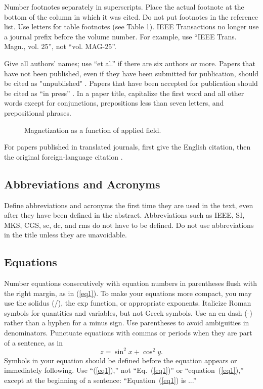 Number footnotes separately in superscripts. Place the actual footnote at
the bottom of the column in which it was cited. Do not put footnotes in
the reference list. Use letters for table footnotes (see Table 1). IEEE
Transactions no longer use a journal prefix before the volume number. For
example, use ``IEEE Trans. Magn., vol. 25'', not ``vol. MAG-25''.

Give all authors' names; use ``et al.'' if there are six authors or more.
Papers that have not been published, even if they have been submitted for
publication, should be cited as "unpublished" \cite{elissa}. Papers that
have been accepted for publication should be cited as ``in press''
\cite{nicole}. In a paper title, capitalize the first word and all other
words except for conjunctions, prepositions less than seven letters, and
prepositional phrases.

\begin{figure}[t]
 \centering
\caption{Magnetization as a function of applied field.} \label{figure1}
\end{figure}

For papers published in translated journals, first give the English
citation, then the original foreign-language citation \cite{yorozu}.


\subsection{Abbreviations and Acronyms}

Define abbreviations and acronyms the first time they are used in the
text, even after they have been defined in the abstract. Abbreviations
such as IEEE, SI, MKS, CGS, sc, dc, and rms do not have to be defined. Do
not use abbreviations in the title unless they are unavoidable.

\subsection{Equations}

Number equations consecutively with equation numbers in
parentheses flush with the right margin, as in (\ref{eq1}). To
make your equations more compact, you may use the solidus (/), the
exp function, or appropriate exponents. Italicize Roman symbols
for quantities and variables, but not Greek symbols. Use an en
dash (-) rather than a hyphen for a minus sign. Use parentheses to
avoid ambiguities in denominators. Punctuate equations with commas
or periods when they are part of a sentence, as in
\begin{equation}
 z = \sin^2 x + \cos^2 y.  \label{eq1}
\end{equation}
Symbols in your equation should be defined before the equation
appears or immediately following. Use ``(\ref{eq1}),'' not
``Eq.~(\ref{eq1})'' or ``equation~(\ref{eq1}),'' except at the
beginning of a sentence: ``Equation~(\ref{eq1}) is ...''


